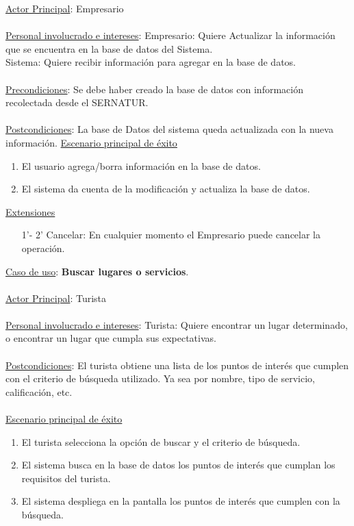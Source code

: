 \documentclass[12pt]{article}
\begin{document}
\underline{Actor Principal}: Empresario\\\\
\underline{Personal involucrado e intereses}: Empresario: Quiere Actualizar la información que se encuentra en la base de datos del Sistema.\\
Sistema: Quiere recibir información para agregar en la base de datos.\\\\
\underline{Precondiciones}: Se debe haber creado la base de datos con información recolectada desde el SERNATUR.\\\\
\underline{Postcondiciones}: La base de Datos del sistema queda actualizada con la nueva información.
\underline{Escenario principal de éxito}
\begin{enumerate}
\item El usuario agrega/borra información en la base de datos.
\item El sistema da cuenta de la modificación y actualiza la base de datos.
\end{enumerate}
\underline{Extensiones}
\begin{enumerate}
\item[1'- 2'] Cancelar: En cualquier momento el Empresario puede cancelar la operación.
\end{enumerate}
\underline{Caso de uso}: \textbf{Buscar lugares o servicios}.\\\\
\underline{Actor Principal}: Turista\\\\
\underline{Personal involucrado e intereses}: Turista: Quiere encontrar un lugar determinado, o encontrar un lugar que cumpla sus expectativas.\\\\
\underline{Postcondiciones}: El turista obtiene una lista de los puntos de interés que cumplen con el criterio de búsqueda utilizado. Ya sea por nombre, tipo de servicio, calificación, etc.\\\\
\underline{Escenario principal de éxito}
\begin{enumerate}
\item El turista selecciona la opción de buscar y el criterio de búsqueda.
\item El sistema busca en la base de datos los puntos de interés que cumplan los requisitos del turista.
\item El sistema despliega en la pantalla los puntos de interés que cumplen con la búsqueda.
\end{enumerate}
\end{document}
